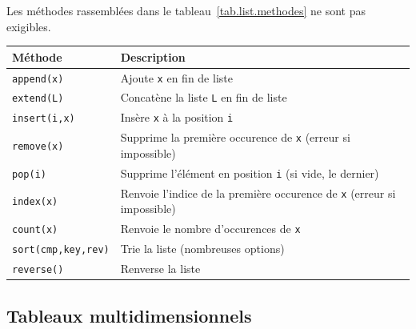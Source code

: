 %

Les méthodes rassemblées dans le tableau~\ref{tab.list.methodes} ne sont pas exigibles.
\begin{center}
    \begin{tabular}{lp{9cm}}
      \hline 
      \textbf{Méthode} & \textbf{Description} \\
      \hline
      \texttt{append(x)} & Ajoute \texttt{x} en fin de liste \\
      \texttt{extend(L)} & Concatène la liste \texttt{L} en fin de liste \\
      \texttt{insert(i,x)} & Insère  \texttt{x} à la position \texttt{i} \\
      \texttt{remove(x)} & Supprime la première occurence de \texttt{x} (erreur si impossible)\\
      \texttt{pop(i)} & Supprime l'élément en position \texttt{i} (si vide, le dernier) \\
      \texttt{index(x)} & Renvoie l'indice de la première occurence de \texttt{x} (erreur si impossible)\\
      \texttt{count(x)} & Renvoie le nombre d'occurences de \texttt{x} \\
      \texttt{sort(cmp,key,rev)} & Trie la liste (nombreuses options) \\
      \texttt{reverse()} & Renverse la liste \\
      \hline
    \end{tabular}
  \label{tab.list.methodes}
  \end{center}
\subsection{Tableaux multidimensionnels}

